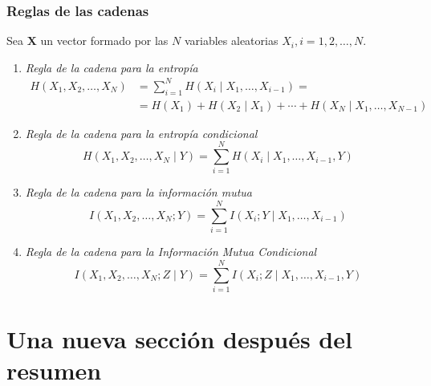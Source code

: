 \begin{Resumen}
\subsubsection*{Reglas de las cadenas}
Sea $\mathbf{X}$   un vector formado por las $N$ variables aleatorias $X_{i}, i=1, 2, \ldots,N$.
\begin{enumerate}
\item \emph{Regla de la cadena para la entropía}
\begin{align*}
H\left( {X_{1}, X_{2}, \ldots, X_{N}} \right)&=\sum_{i=1}^{N}{H\left( {X_{i}\mid X_{1},\ldots, X_{i-1}} \right)}= \\
&=H\left( {X_{1}} \right)+H\left( {X_{2}\mid X_{1}} \right)+ \cdots +H\left( {X_{N}\mid X_{1},\ldots, X_{N-1}} \right) 
\end{align*}
\item \emph{Regla de la cadena para la entropía condicional}
\begin{equation*}
H\left( {X_{1}, X_{2}, \ldots, X_{N} \mid Y} \right)=\sum_{i=1}^{N}{H\left( {X_{i}\mid X_{1},\ldots ,X_{i-1}, Y} \right)}
\end{equation*}
\item \emph{Regla de la cadena para la información mutua}
\begin{equation*}
I\left( {X_{1}, X_{2}, \ldots, X_{N} ; Y} \right)=\sum_{i=1}^{N}{I\left( {X_{i} ;Y \mid X_{1},\ldots, X_{i-1}} \right)}
\end{equation*}
\item \emph{Regla de la cadena para la Información Mutua Condicional}
\begin{equation*}
I\left( {X_{1}, X_{2}, \ldots, X_{N} ; Z \mid Y} \right)=\sum_{i=1}^{N}{I\left( {X_{i} ;Z \mid X_{1},\ldots, X_{i-1},Y} \right)}
\end{equation*}
\end{enumerate}
\end{Resumen}

\section{Una nueva sección después del resumen}




\cleardoublepage
{}
\pagestyle{probprop}
\captionsetup[figure]{textformat=simple}

